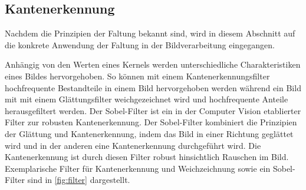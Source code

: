 
\subsection{Kantenerkennung}
\label{sec:kantenerkennung}

Nachdem die Prinzipien der Faltung bekannt sind, wird in diesem Abschnitt auf die konkrete Anwendung der Faltung in der Bildverarbeitung eingegangen.

Anhängig von den Werten eines Kernels werden unterschiedliche Charakteristiken eines Bildes hervorgehoben. So können mit einem Kantenerkennungsfilter hochfrequente Bestandteile in einem Bild hervorgehoben werden während ein Bild mit mit einem Glättungsfilter weichgezeichnet wird und hochfrequente Anteile herausgefiltert werden. Der Sobel-Filter ist ein in der Computer Vision etablierter Filter zur robusten Kantenerkennung\cite{sobel,cv_general}. Der Sobel-Filter kombiniert die Prinzipien der Glättung und Kantenerkennung, indem das Bild in einer Richtung geglättet wird und in der anderen eine Kantenerkennung durchgeführt wird. Die Kantenerkennung ist durch diesen Filter robust hinsichtlich Rauschen im Bild. Exemplarische Filter für Kantenerkennung und Weichzeichnung sowie ein Sobel-Filter sind in \autoref{fig:filter} dargestellt.

